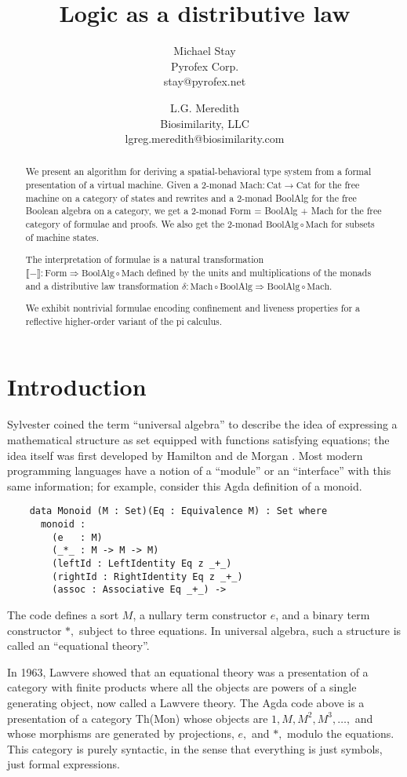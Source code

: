 \documentclass{article}
\title{Logic as a distributive law}
\author{
Michael Stay\\
  {Pyrofex Corp.}\\
  {\fontsize{8}{8}\selectfont stay@pyrofex.net}
\and
L.G. Meredith\\
  {Biosimilarity, LLC}\\
  {\fontsize{8}{8}\selectfont lgreg.meredith@biosimilarity.com}
}
\newcommand{\interp}[1]{\llbracket #1 \rrbracket}
\newcommand{\maps}{\colon}
\newcommand{\Cat}{\mathrm{Cat}}
\newcommand{\Mach}{\mathrm{Mach}}
\newcommand{\BoolAlg}{\mathrm{BoolAlg}}
\newcommand{\Form}{\mathrm{Form}}
\begin{document}
\maketitle
\begin{abstract}
\noindent
  We present an algorithm for deriving a spatial-behavioral type system from a formal presentation of a virtual machine.  Given a 2-monad $\Mach\maps \Cat \to \Cat$ for the free machine on a category of states and rewrites and a 2-monad BoolAlg for the free Boolean algebra on a category, we get a 2-monad Form = BoolAlg + Mach for the free category of formulae and proofs.  We also get the 2-monad $\BoolAlg \circ \Mach$ for subsets of machine states. 

  The interpretation of formulae is a natural transformation $\interp{-} \maps \Form \Rightarrow \BoolAlg \circ \Mach$ defined by the units and multiplications of the monads and a distributive law transformation $\delta\maps \Mach \circ \BoolAlg \Rightarrow \BoolAlg \circ \Mach.$

  We exhibit nontrivial formulae encoding confinement and liveness properties for a reflective higher-order variant of the pi calculus.

\end{abstract}
\section{Introduction}

  Sylvester coined the term ``universal algebra'' to describe the idea of expressing a mathematical structure as set equipped with functions satisfying equations; the idea itself was first developed by Hamilton and de Morgan \cite{Whitehead}.  Most modern programming languages have a notion of a ``module'' or an ``interface'' with this same information; for example, consider this Agda definition of a monoid.
  \begin{verbatim}
    data Monoid (M : Set)(Eq : Equivalence M) : Set where
      monoid :
        (e   : M)
        (_*_ : M -> M -> M)
        (leftId : LeftIdentity Eq z _+_)
        (rightId : RightIdentity Eq z _+_)
        (assoc : Associative Eq _+_) ->
  \end{verbatim}
  The code defines a sort $M$, a nullary term constructor $e$, and a binary term constructor $*,$ subject to three equations.  In universal algebra, such a structure is called an ``equational theory''.

  In 1963, Lawvere \cite{Lawvere} showed that an equational theory was a presentation of a category with finite products where all the objects are powers of a single generating object, now called a Lawvere theory.  The Agda code above is a presentation of a category Th(Mon) whose objects are $1, M, M^2, M^3, \ldots,$ and whose morphisms are generated by projections, $e,$ and $*,$ modulo the equations.  This category is purely syntactic, in the sense that everything is just symbols, just formal expressions.
\end{document}
